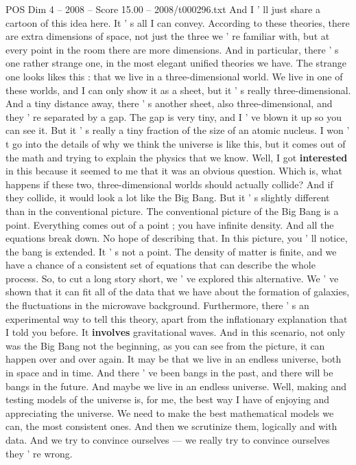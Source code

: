 \begin{textsample}{POS Dim 4 – 2008 – Score 15.00 – 2008/t000296.txt}
And I ' ll just share a cartoon of this idea here.
It ' s all I can convey.
According to these theories, there are extra dimensions of space, not just the three we ' re familiar with, but at every point in the room there are more dimensions.
And in particular, there ' s one rather strange one, in the most elegant unified theories we have.
The strange one looks likes this : that we live in a three-dimensional world.
We live in one of these worlds, and I can only show it as a sheet, but it ' s really three-dimensional.
And a tiny distance away, there ' s another sheet, also three-dimensional, and they ' re separated by a gap.
The gap is very tiny, and I ' ve blown it up so you can see it.
But it ' s really a tiny fraction of the size of an atomic nucleus.
I won ' t go into the details of why we think the universe is like this, but it comes out of the math and trying to explain the physics that we know.
Well, I got \textbf{interested} in this because it seemed to me that it was an obvious question.
Which is, what happens if these two, three-dimensional worlds should actually collide?
And if they collide, it would look a lot like the Big Bang.
But it ' s slightly different than in the conventional picture.
The conventional picture of the Big Bang is a point.
Everything comes out of a point ; you have infinite density.
And all the equations break down.
No hope of describing that.
In this picture, you ' ll notice, the bang is extended.
It ' s not a point.
The density of matter is finite, and we have a chance of a consistent set of equations that can describe the whole process.
So, to cut a long story short, we ' ve explored this alternative.
We ' ve shown that it can fit all of the data that we have about the formation of galaxies, the fluctuations in the microwave background.
Furthermore, there ' s an experimental way to tell this theory, apart from the inflationary explanation that I told you before.
It \textbf{involves} gravitational waves.
And in this scenario, not only was the Big Bang not the beginning, as you can see from the picture, it can happen over and over again.
It may be that we live in an endless universe, both in space and in time.
And there ' ve been bangs in the past, and there will be bangs in the future.
And maybe we live in an endless universe.
Well, making and testing models of the universe is, for me, the best way I have of enjoying and appreciating the universe.
We need to make the best mathematical models we can, the most consistent ones.
And then we scrutinize them, logically and with data.
And we try to convince ourselves — we really try to convince ourselves they ' re wrong.

\end{textsample}
